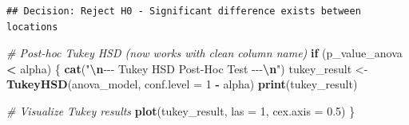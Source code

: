\documentclass[
  12pt,
]{article}
\newenvironment{Shaded}{\begin{snugshade}}{\end{snugshade}}
\newcommand{\AttributeTok}[1]{\textcolor[rgb]{0.13,0.29,0.53}{#1}}
\newcommand{\CommentTok}[1]{\textcolor[rgb]{0.56,0.35,0.01}{\textit{#1}}}
\newcommand{\ControlFlowTok}[1]{\textcolor[rgb]{0.13,0.29,0.53}{\textbf{#1}}}
\newcommand{\DecValTok}[1]{\textcolor[rgb]{0.00,0.00,0.81}{#1}}
\newcommand{\FloatTok}[1]{\textcolor[rgb]{0.00,0.00,0.81}{#1}}
\newcommand{\FunctionTok}[1]{\textcolor[rgb]{0.13,0.29,0.53}{\textbf{#1}}}
\newcommand{\NormalTok}[1]{#1}
\newcommand{\OtherTok}[1]{\textcolor[rgb]{0.56,0.35,0.01}{#1}}
\newcommand{\SpecialCharTok}[1]{\textcolor[rgb]{0.81,0.36,0.00}{\textbf{#1}}}
\newcommand{\StringTok}[1]{\textcolor[rgb]{0.31,0.60,0.02}{#1}}
\begin{document}
\begin{verbatim}
## Decision: Reject H0 - Significant difference exists between locations
\end{verbatim}

\begin{Shaded}
\begin{Highlighting}[]
\CommentTok{\# Post{-}hoc Tukey HSD (now works with clean column name)}
\ControlFlowTok{if}\NormalTok{ (p\_value\_anova }\SpecialCharTok{\textless{}}\NormalTok{ alpha) \{}
    \FunctionTok{cat}\NormalTok{(}\StringTok{"}\SpecialCharTok{\textbackslash{}n}\StringTok{{-}{-}{-} Tukey HSD Post{-}Hoc Test {-}{-}{-}}\SpecialCharTok{\textbackslash{}n}\StringTok{"}\NormalTok{)}
\NormalTok{    tukey\_result }\OtherTok{\textless{}{-}} \FunctionTok{TukeyHSD}\NormalTok{(anova\_model, }\AttributeTok{conf.level =} \DecValTok{1} \SpecialCharTok{{-}}\NormalTok{ alpha)}
    \FunctionTok{print}\NormalTok{(tukey\_result)}

    \CommentTok{\# Visualize Tukey results}
    \FunctionTok{plot}\NormalTok{(tukey\_result, }\AttributeTok{las =} \DecValTok{1}\NormalTok{, }\AttributeTok{cex.axis =} \FloatTok{0.5}\NormalTok{)}
\NormalTok{\}}
\end{Highlighting}
\end{Shaded}
\end{document}
